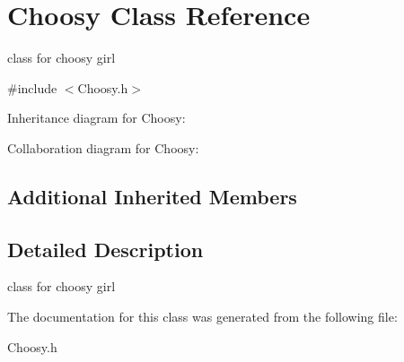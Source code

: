\hypertarget{classChoosy}{}\section{Choosy Class Reference}
\label{classChoosy}


class for choosy girl  




{\ttfamily \#include $<$Choosy.\+h$>$}



Inheritance diagram for Choosy\+:


Collaboration diagram for Choosy\+:
\subsection*{Additional Inherited Members}


\subsection{Detailed Description}
class for choosy girl 

The documentation for this class was generated from the following file\+:\begin{DoxyCompactItemize}
\item 
Choosy.\+h\end{DoxyCompactItemize}
